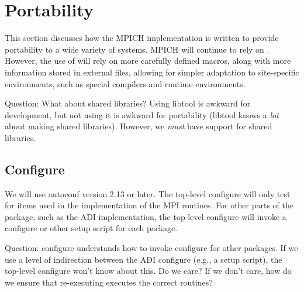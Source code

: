 \documentclass{article}
\begin{document}

\section{Portability}

This section discusses how the MPICH implementation is written to
provide portability to a wide variety of systems.  MPICH will continue
to rely on .  However, the use of 
will rely on more carefully defined macros, along with more
information stored in external files, allowing for simpler adaptation
to site-specific environments, such as special compilers and runtime
environments. 

Question: What about shared libraries?  Using libtool is awkward for
development, but not using it is awkward for portability (libtool
knows a \emph{lot} about making shared libraries).  However, we
\emph{must} have support for shared libraries.

\subsection{Configure}
We will use autoconf version 2.13 or later.  The top-level configure will only
test for items used in the implementation of the MPI routines.  For
other parts of the package, such as the ADI implementation, the
top-level configure will invoke a configure or other setup script for
each package.

Question: configure understands how to invoke configure for other
packages.  If we use a level of indirection between the ADI configure
(e.g., a setup script), the top-level configure won't know about
this.  Do we care?  If we don't care, how do we ensure that
re-executing  executes the correct routines?
\end{document}
